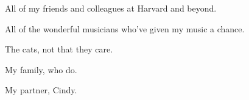 

%
%
%
%
%
%
%
%
%
%
%

All of my friends and colleagues at Harvard and beyond.

All of the wonderful musicians who've given my music a chance.

The cats, not that they care.

My family, who do.

My partner, Cindy.